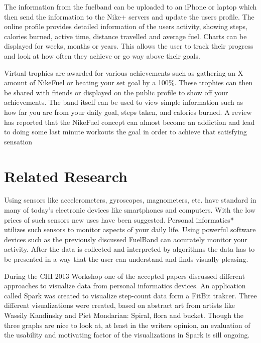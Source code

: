 The information from the fuelband can be uploaded to an iPhone or laptop which then send the information to the Nike+ servers and update the users profile. The online profile provides detailed information of the users activity, showing steps, calories burned, active time, distance travelled and average fuel. Charts can be displayed for weeks, months or years. This allows the user to track their progress and look at how often they achieve or go way above their goals.\cite{fuelbandTechSpce} 

Virtual trophies are awarded for various achievements such as gathering an X amount of NikeFuel or beating your set goal by a 100\%. These trophies can then be shared with friends or displayed on the public profile to show off your achievements. The band itself can be used to view simple information such as how far you are from your daily goal, steps taken, and calories burned. A review has reported that the NikeFuel concept can almost become an addiction and lead to doing some last minute workouts the goal in order to achieve that satisfying sensation \cite{fuelbandDcRain}

\section{Related Research}
Using sensors like accelerometers, gyroscopes, magnometers, etc. have standard in many of today's electronic devices like smartphones and computers. With the low prices of such sensors new uses have been suggested. Personal informatics* utilizes such sensors to monitor aspects of your daily life. Using powerful software devices such as the previously discussed FuelBand %
can accurately monitor your activity. After the data is collected and interpreted by algorithms the data has to be presented in a way that the user can understand and finds visually pleasing. 

During the CHI 2013 Workshop \cite{chi2013} one of the accepted papers discussed different approaches to visualize data from personal informatics devices. %
An application called Spark was created to visualize step-count data form a FitBit trakcer. %
Three different visualizations were created, based on abstract art from artists like Wassily Kandinsky and Piet Mondarian: Spiral, flora and bucket. %
Though the three graphs are nice to look at, at least in the writers opinion, an evaluation of the usability and motivating factor of the visualizations in Spark is sill ongoing. 

